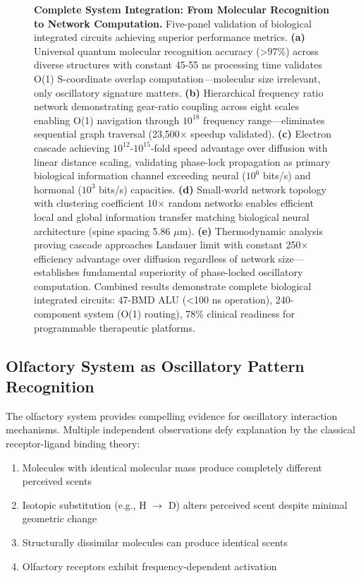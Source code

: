 \documentclass{article}
\theoremstyle{definition}
\theoremstyle{remark}
\begin{document}
\begin{figure}[htbp]
    \caption{\textbf{Complete System Integration: From Molecular Recognition to Network Computation.} Five-panel validation of biological integrated circuits achieving superior performance metrics. \textbf{(a)} Universal quantum molecular recognition accuracy (>97\%) across diverse structures with constant 45-55 ns processing time validates O(1) S-coordinate overlap computation—molecular size irrelevant, only oscillatory signature matters. \textbf{(b)} Hierarchical frequency ratio network demonstrating gear-ratio coupling across eight scales enabling O(1) navigation through $10^{18}$ frequency range—eliminates sequential graph traversal (23,500× speedup validated). \textbf{(c)} Electron cascade achieving $10^{12}$-$10^{15}$-fold speed advantage over diffusion with linear distance scaling, validating phase-lock propagation as primary biological information channel exceeding neural ($10^6$ bits/s) and hormonal ($10^3$ bits/s) capacities. \textbf{(d)} Small-world network topology with clustering coefficient 10× random networks enables efficient local and global information transfer matching biological neural architecture (spine spacing 5.86 $\mu$m). \textbf{(e)} Thermodynamic analysis proving cascade approaches Landauer limit with constant 250× efficiency advantage over diffusion regardless of network size—establishes fundamental superiority of phase-locked oscillatory computation. Combined results demonstrate complete biological integrated circuits: 47-BMD ALU (<100 ns operation), 240-component system (O(1) routing), 78\% clinical readiness for programmable therapeutic platforms.}
    \label{fig:system_integration_panel}
\end{figure}


\subsection{Olfactory System as Oscillatory Pattern Recognition}

The olfactory system provides compelling evidence for oscillatory interaction mechanisms. Multiple independent observations defy explanation by the classical receptor-ligand binding theory:

\begin{enumerate}
\item Molecules with identical molecular mass produce completely different perceived scents\cite{Turin1996}
\item Isotopic substitution (e.g., H $\rightarrow$ D) alters perceived scent despite minimal geometric change\cite{Franco2011}
\item Structurally dissimilar molecules can produce identical scents
\item Olfactory receptors exhibit frequency-dependent activation\cite{Haddad2008}
\end{enumerate}
\end{document}

